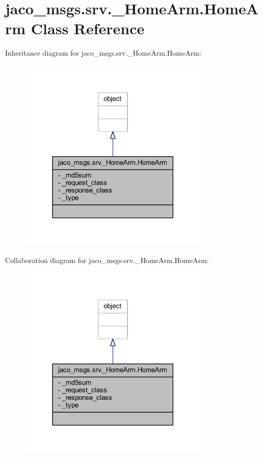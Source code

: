 \hypertarget{classjaco__msgs_1_1srv_1_1__HomeArm_1_1HomeArm}{}\section{jaco\+\_\+msgs.\+srv.\+\_\+\+Home\+Arm.\+Home\+Arm Class Reference}
\label{classjaco__msgs_1_1srv_1_1__HomeArm_1_1HomeArm}


Inheritance diagram for jaco\+\_\+msgs.\+srv.\+\_\+\+Home\+Arm.\+Home\+Arm\+:
\nopagebreak
\begin{figure}[H]
\begin{center}
\leavevmode
\includegraphics[width=257pt]{d7/d10/classjaco__msgs_1_1srv_1_1__HomeArm_1_1HomeArm__inherit__graph}
\end{center}
\end{figure}


Collaboration diagram for jaco\+\_\+msgs.\+srv.\+\_\+\+Home\+Arm.\+Home\+Arm\+:
\nopagebreak
\begin{figure}[H]
\begin{center}
\leavevmode
\includegraphics[width=257pt]{d0/d79/classjaco__msgs_1_1srv_1_1__HomeArm_1_1HomeArm__coll__graph}
\end{center}
\end{figure}
